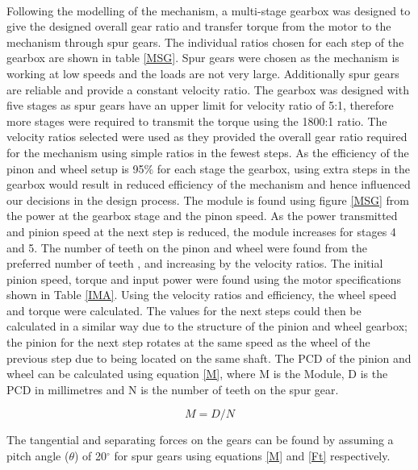 \documentclass[a4paper]{article}
\begin{document}
\paragraph{}
Following the modelling of the mechanism, a multi-stage gearbox was designed to give the designed overall gear ratio and transfer torque from the motor to the mechanism through spur gears. The individual ratios chosen for each step of the gearbox are shown in table \ref{MSG}. Spur gears were chosen as the mechanism is working at low speeds and the loads are not very large. Additionally spur gears are reliable and provide a constant velocity ratio. The gearbox was designed with five stages as spur gears have an upper limit for velocity ratio of 5:1, therefore more stages were required to transmit the torque using the 1800:1 ratio. The velocity ratios selected were used as they provided the overall gear ratio required for the mechanism using simple ratios in the fewest steps. As the efficiency of the pinon and wheel setup is 95$\%$ for each stage the gearbox, using extra steps in the gearbox would result in reduced efficiency of the mechanism and hence influenced our decisions in the design process. The module is found using figure \ref{MSG} from the power at the gearbox stage and the pinon speed. As the power transmitted and pinion speed at the next step is reduced, the module increases for stages 4 and 5. The number of teeth on the pinon and wheel were found from the preferred number of teeth \cite{korane_2015}, and increasing by the velocity ratios. The initial pinion speed, torque and input power were found using the motor specifications shown in Table \ref{IMA}. Using the velocity ratios and efficiency, the wheel speed and torque were calculated. The values for the next steps could then be calculated in a similar way due to the structure of the pinion and wheel gearbox; the pinion for the next step rotates at the same speed as the wheel of the previous step due to being located on the same shaft. The PCD of the pinion and wheel can be calculated using equation \ref{M}, where M is the Module, D is the PCD in millimetres and N is the number of teeth on the spur gear.

\begin{equation}
    M=D/N
    \label{M}
\end{equation}

The tangential and separating forces on the gears can be found by assuming a pitch angle ($\theta$) of 20$^{\circ}$ for spur gears using equations \ref{M} and \ref{Ft} respectively. 
\end{document}
